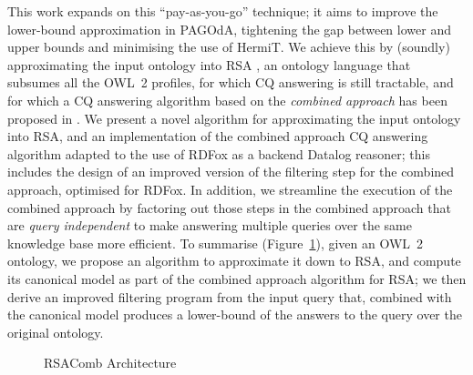 \documentclass[runningheads]{llncs}
\newcommand{\pagoda}{\mbox{PAGOdA}\xspace}
\newcommand{\rdfox}{\mbox{RDFox}\xspace}
\newcommand{\hermit}{\mbox{HermiT}\xspace}
\newcommand{\datalog}{\mbox{Datalog}\xspace}
\newcommand{\rsacomb}{\mbox{RSAComb}\xspace}
\begin{document}
This work expands on this ``pay-as-you-go'' technique; it aims to improve the lower-bound approximation in \pagoda, tightening the gap between lower and upper bounds and minimising the use of \hermit.
We achieve this by (soundly) approximating the input ontology into RSA \cite{carral2014}, an ontology language that subsumes all the OWL~2 profiles, for which CQ answering is still tractable, and for which a CQ answering algorithm based on the \emph{combined approach} has been proposed in \cite{feier2015}.
We present a novel algorithm for approximating the input ontology into RSA, and an 
implementation \cite{igne2021a} of the combined approach CQ answering algorithm adapted to the use of \rdfox \cite{nenov2015,motik2014,motik2015b,motik2015c} as a backend \datalog reasoner;
this includes the design of an improved version of the filtering step for the combined approach, optimised for \rdfox.
In addition, we streamline the execution of the combined approach by factoring out those steps in the combined approach that are \emph{query independent} to make answering multiple queries over the same knowledge base more efficient.
To summarise (Figure~\ref{fig:rsacomb_architecture}), given an OWL~2 ontology, we propose an algorithm to approximate it down to RSA, and compute its canonical model as part of the combined approach algorithm for RSA; we then derive an improved filtering program from the input query that, combined with the canonical model produces a lower-bound of the answers to the query over the original ontology.

\begin{figure}
    \caption{\rsacomb Architecture}
    \label{fig:rsacomb_architecture}
\end{figure}
\end{document}
